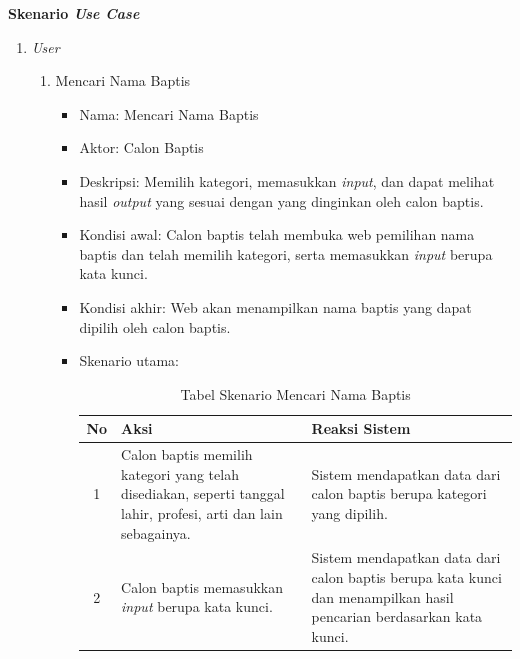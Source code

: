 \begin{itemize}
\begin{itemize}

				\end{itemize}
	\end{itemize}
	
\textbf{Skenario \textit{Use Case}}
\label{sec:skenariousecase}
\begin{enumerate}
\item \textit{User}


                       \begin{enumerate}
                        \item Mencari Nama Baptis
                                \begin{itemize}
                                        \item Nama: Mencari Nama Baptis
                                        \item Aktor: Calon Baptis
                                        \item Deskripsi: Memilih kategori, memasukkan \textit{input}, dan dapat melihat hasil \textit{output} yang sesuai dengan yang dinginkan oleh calon baptis.
                                        \item Kondisi awal: Calon baptis telah membuka web pemilihan nama baptis dan telah memilih kategori, serta memasukkan \textit{input} berupa kata kunci. %
                                        \item Kondisi akhir: Web akan menampilkan nama baptis yang dapat dipilih oleh calon baptis.%
                                        \item Skenario utama:														
				
				
				\begin{table}[H]
	\centering
	\caption{Tabel Skenario Mencari Nama Baptis}
		\begin{tabular}{| c | p{6cm} |p{6cm} |} \hline
     No  & Aksi & Reaksi Sistem\\ \hline 
		1 & Calon baptis memilih kategori yang telah disediakan, 
		seperti tanggal lahir, profesi, arti dan lain sebagainya. %
		&  Sistem mendapatkan data dari calon baptis berupa kategori yang dipilih.\\ \hline 
		2 & Calon baptis memasukkan \textit{input} berupa kata kunci. & Sistem mendapatkan data dari calon baptis berupa kata kunci dan menampilkan hasil pencarian berdasarkan kata kunci. \\ \hline
		

\end{tabular}
\end{table}
\end{itemize}
\end{enumerate}
\end{enumerate}
